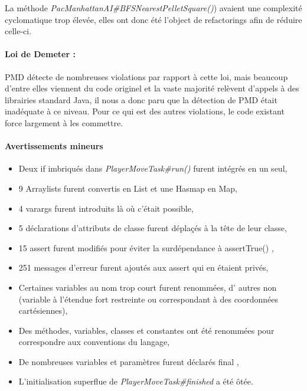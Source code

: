 \documentclass[12pt, openany]{report}
\begin{document}
La méthode \mbox{\textit{PacManhattanAI\#BFSNearestPelletSquare()}}) avaient une complexité cyclomatique trop élevée, elles ont donc été l'object de \og refactorings \fg afin de réduire celle-ci.

\paragraph{Loi de Demeter : }

PMD détecte de nombreuses violations par rapport à cette loi, mais beaucoup d'entre elles viennent du code originel et la vaste majorité relèvent d'appels à des librairies standard Java, il nous a donc paru que la détection de PMD était inadéquate à ce niveau.
Pour ce qui est des autres violations, le code existant force largement à les commettre.

\paragraph{Avertissements mineurs}

\begin{itemize}
	\item Deux \og if \fg{} imbriqués dans \mbox{\textit{PlayerMoveTask\#run()}} furent intégrés en un seul,
	\item 9 Arraylists furent convertis en List et une Hasmap en Map,
	\item 4 \og varargs \fg{} furent introduits là où c'était possible,
	\item 5 déclarations d'attributs de classe furent déplaçés à la tête de leur classe,
	\item 15 \og assert \fg{} furent modifiés pour éviter la surdépendance à \og assertTrue() \fg{},
	\item 251 messages d'erreur furent ajoutés aux \og assert \fg{} qui en étaient privés,
	\item Certaines variables au nom trop court furent renommées, d' autres non (variable à l'étendue fort restreinte ou correspondant à des coordonnées cartésiennes),
	\item Des méthodes, variables, classes et constantes ont été renommées pour correspondre aux conventions du langage,
	\item De nombreuses variables et paramètres furent déclarés \og final \fg{},
	\item L'initialisation superflue de \mbox{\textit{PlayerMoveTask\#finished}} a été ôtée.
\end{itemize}
\end{document}
